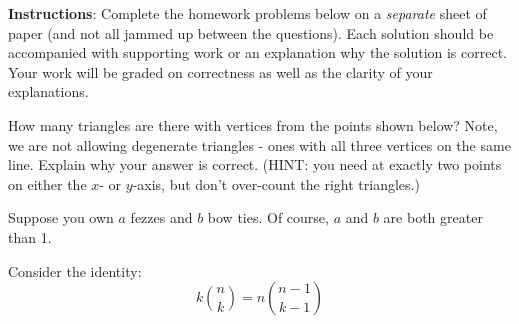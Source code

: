 \documentclass[11pt]{exam}
\begin{document}
\noindent \textbf{Instructions}: Complete the homework problems below on a {\em separate} sheet of paper (and not all jammed up between the questions). Each solution should be accompanied with supporting work or an explanation why the solution is correct. Your work will be graded on correctness as well as the clarity of your explanations. 



\begin{questions}
\question[5] How many triangles are there with vertices from the points shown below?  Note, we are not allowing degenerate triangles - ones with all three vertices on the same line.  Explain why your answer is correct. (HINT: you need at exactly two points on either the $x$- or $y$-axis, but don't over-count the right triangles.)

\begin{center}

  
\end{center}

\question[6] Suppose you own $a$ fezzes and $b$ bow ties.  Of course, $a$ and $b$ are both greater than 1.


\question Consider the identity:
\[k{n\choose k} = n{n-1 \choose k-1}\]
\begin{parts}

\end{parts}
\end{questions}
\end{document}
